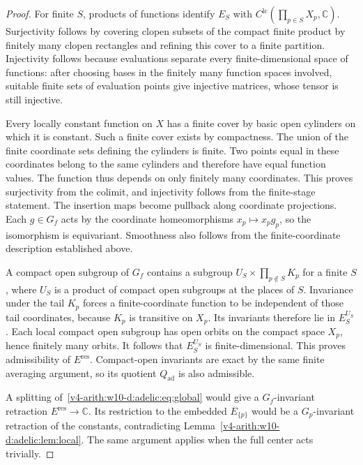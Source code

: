\begin{proof}
For finite $S$, products of functions identify $E_S$ with
$C^{\mathrm{lc}}(\prod_{p\in S}X_p,\mathbb C)$. Surjectivity follows by covering
clopen subsets of the compact finite product by finitely many clopen
rectangles and refining this cover to a finite partition. Injectivity
follows because evaluations separate every finite-dimensional space of
functions: after choosing bases in the finitely many function spaces
involved, suitable finite sets of evaluation points give injective
matrices, whose tensor is still injective.

Every locally constant function on $X$ has a finite cover by basic open
cylinders on which it is constant. Such a finite cover exists by
compactness. The union of the finite coordinate sets defining the
cylinders is finite. Two points equal in these coordinates belong to
the same cylinders and therefore have equal function values. The function
thus depends on only finitely many coordinates. This proves surjectivity
from the colimit, and injectivity follows from the finite-stage statement.
The insertion maps become pullback along coordinate projections.
Each $g\in G_f$ acts by the coordinate homeomorphisms $x_p\mapsto x_pg_p$,
so the isomorphism is equivariant. Smoothness also follows from the
finite-coordinate description established above.

A compact open subgroup of $G_f$ contains a subgroup
$U_S\times\prod_{p\notin S}K_p$ for a finite $S$, where $U_S$ is a
product of compact open subgroups at the places of $S$. Invariance under
the tail $K_p$ forces a finite-coordinate function to be independent of
those tail coordinates, because $K_p$ is transitive on $X_p$.
Its invariants therefore lie in $E_S^{U_S}$. Each local compact open
subgroup has open orbits on the compact space $X_p$, hence finitely many
orbits. It follows that $E_S^{U_S}$ is finite-dimensional.
This proves admissibility of $E^{\mathrm{res}}$. Compact-open invariants
are exact by the same finite averaging argument, so its quotient $Q_{\mathrm{ad}}$
is also admissible.

A splitting of~\eqref{v4-arith:w10-d:adelic:eq:global} would give a $G_f$-invariant retraction
$E^{\mathrm{res}}\to\mathbb C$. Its restriction to the embedded $E_{\{p\}}$
would be a $G_p$-invariant retraction of the constants, contradicting
Lemma~\ref{v4-arith:w10-d:adelic:lem:local}. The same argument applies when the full center
acts trivially.
\end{proof}

